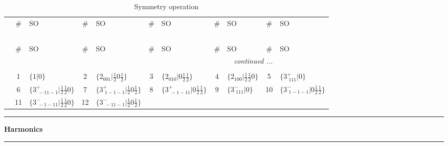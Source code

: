\documentclass[fleqn,10pt,landscape]{jsarticle}
\begin{document}
\renewcommand{\arraystretch}{1.6}
\begin{longtable}[l]{c|cl|cl|cl|cl|cl}
\captionsetup{justification=raggedright, singlelinecheck=off}
\caption{Symmetry operation}
 \\
 \hline \hline
 & \# & SO & \# & SO & \# & SO & \# & SO & \# & SO \\ \hline \endfirsthead

\multicolumn{10}{l}{\tablename\ \thetable{}} \\
 \hline \hline
 & \# & SO & \# & SO & \# & SO & \# & SO & \# & SO \\ \hline \endhead

 \hline \hline
\multicolumn{10}{r}{\footnotesize\it continued ...} \\ \endfoot

 \hline \hline
\multicolumn{10}{r}{} \\ \endlastfoot

 & 1 & $\{1|0\}$ & 2 & $\{2{}_{001}|\frac{1}{2} 0 \frac{1}{2}\}$ & 3 & $\{2{}_{010}|0 \frac{1}{2} \frac{1}{2}\}$ & 4 & $\{2{}_{100}|\frac{1}{2} \frac{1}{2} 0\}$ & 5 & $\{3^{+}_{\,\,111}|0\}$ \\
& 6 & $\{3^{+}_{\,\,-11-1}|\frac{1}{2} \frac{1}{2} 0\}$ & 7 & $\{3^{+}_{\,\,1-1-1}|\frac{1}{2} 0 \frac{1}{2}\}$ & 8 & $\{3^{+}_{\,\,-1-11}|0 \frac{1}{2} \frac{1}{2}\}$ & 9 & $\{3^{-}_{\,\,111}|0\}$ & 10 & $\{3^{-}_{\,\,1-1-1}|0 \frac{1}{2} \frac{1}{2}\}$ \\
& 11 & $\{3^{-}_{\,\,-1-11}|\frac{1}{2} \frac{1}{2} 0\}$ & 12 & $\{3^{-}_{\,\,-11-1}|\frac{1}{2} 0 \frac{1}{2}\}$ &  &  &  &  &  &  \\
\end{longtable}
\vspace{5mm}
\noindent \rule[0.5mm]{5mm}{0.5mm}\hspace{3mm}\textbf{Harmonics}\hspace{3mm}\leaders\hrule height 0.5mm\hfill\kern0pt
\vspace{3mm}
\end{document}
